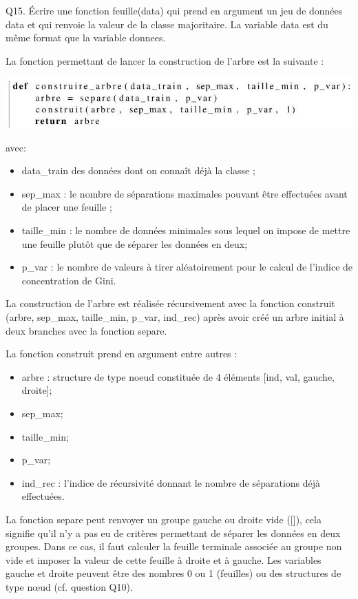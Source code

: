 \documentclass[10pt]{article}
\begin{document}
Q15. Écrire une fonction feuille(data) qui prend en argument un jeu de données data et qui renvoie la valeur de la classe majoritaire. La variable data est du même format que la variable donnees.

La fonction permettant de lancer la construction de l'arbre est la suivante :

\includegraphics[max width=\textwidth]{2022_02_02_1af495ea60fb42b668bfg-10}

avec:

\begin{itemize}
  \item data\_train des données dont on connaît déjà la classe ;

  \item sep\_max : le nombre de séparations maximales pouvant être effectuées avant de placer une feuille ;

  \item taille\_min : le nombre de données minimales sous lequel on impose de mettre une feuille plutôt que de séparer les données en deux;

  \item p\_var : le nombre de valeurs à tirer aléatoirement pour le calcul de l'indice de concentration de Gini.

\end{itemize}
La construction de l'arbre est réalisée récursivement avec la fonction construit (arbre, sep\_max, taille\_min, p\_var, ind\_rec) après avoir créé un arbre initial à deux branches avec la fonction separe.

La fonction construit prend en argument entre autres :

\begin{itemize}
  \item arbre : structure de type noeud constituée de 4 éléments [ind, val, gauche, droite];

  \item sep\_max;

  \item taille\_min;

  \item p\_var;

  \item ind\_rec : l'indice de récursivité donnant le nombre de séparations déjà effectuées.

\end{itemize}
La fonction separe peut renvoyer un groupe gauche ou droite vide ([]), cela signifie qu'il n'y a pas eu de critères permettant de séparer les données en deux groupes. Dans ce cas, il faut calculer la feuille terminale associée au groupe non vide et imposer la valeur de cette feuille à droite et à gauche. Les variables gauche et droite peuvent être des nombres 0 ou 1 (feuilles) ou des structures de type nœud (cf. question Q10).
\end{document}
